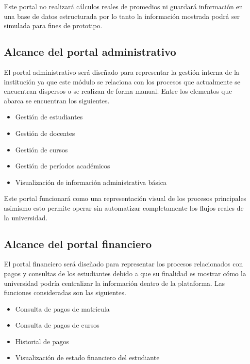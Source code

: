 \documentclass[11pt,spanish]{article}
\begin{document}
Este portal no realizará cálculos reales de promedios ni guardará información en una base de datos estructurada por lo tanto la información mostrada podrá ser simulada para fines de prototipo.

\subsection{Alcance del portal administrativo}

El portal administrativo será diseñado para representar la gestión interna de la institución ya que este módulo se relaciona con los procesos que actualmente se encuentran dispersos o se realizan de forma manual. Entre los elementos que abarca se encuentran los siguientes.

\begin{itemize}[leftmargin=*]
    \item Gestión de estudiantes
    \item Gestión de docentes
    \item Gestión de cursos
    \item Gestión de períodos académicos
    \item Visualización de información administrativa básica
\end{itemize}

Este portal funcionará como una representación visual de los procesos principales asimismo esto permite operar sin automatizar completamente los flujos reales de la universidad.

\subsection{Alcance del portal financiero}

El portal financiero será diseñado para representar los procesos relacionados con pagos y consultas de los estudiantes debido a que su finalidad es mostrar cómo la universidad podría centralizar la información dentro de la plataforma. Las funciones consideradas son las siguientes.

\begin{itemize}[leftmargin=*]
    \item Consulta de pagos de matrícula
    \item Consulta de pagos de cursos
    \item Historial de pagos
    \item Visualización de estado financiero del estudiante
\end{itemize}
\end{document}
